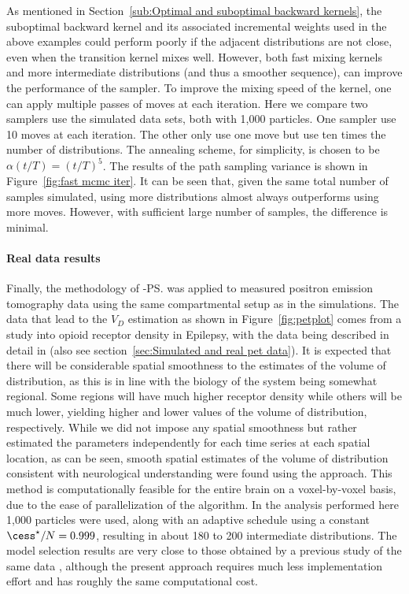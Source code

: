 As mentioned in Section~\ref{sub:Optimal and suboptimal backward kernels}, the
suboptimal backward kernel and its associated incremental weights used in the
above examples could perform poorly if the adjacent distributions are not
close, even when the transition kernel mixes well. However, both fast mixing
kernels and more intermediate distributions (and thus a smoother sequence),
can improve the performance of the sampler. To improve the mixing speed of the
kernel, one can apply multiple passes of \mcmc moves at each iteration. Here
we compare two samplers use the simulated data sets, both with 1,000 particles.
One sampler use 10 \mcmc moves at each iteration. The other only use one \mcmc
move but use ten times the number of distributions. The annealing scheme, for
simplicity, is chosen to be $\alpha(t/T) = (t/T)^5$. The results of the path
sampling variance is shown in Figure~\ref{fig:fast mcmc iter}. It can be seen
that, given the same total number of samples simulated, using more
distributions almost always outperforms using more \mcmc moves. However, with
sufficient large number of samples, the difference is minimal.



\paragraph{Real data results}

Finally, the methodology of \smc[2]-\ps was applied to measured positron
emission tomography data using the same compartmental setup as in the
simulations. The data that lead to the $V_D$ estimation as shown in
Figure~\ref{fig:petplot} comes from a study into opioid receptor density in
Epilepsy, with the data being described in detail in \cite{Jiang:2009kf} (also
see section~\ref{sec:Simulated and real pet data}). It is expected that there
will be considerable spatial smoothness to the estimates of the volume of
distribution, as this is in line with the biology of the system being somewhat
regional. Some regions will have much higher receptor density while others
will be much lower, yielding higher and lower values of the volume of
distribution, respectively.  While we did not impose any spatial smoothness
but rather estimated the parameters independently for each time series at each
spatial location, as can be seen, smooth spatial estimates of the volume of
distribution consistent with neurological understanding were found using the
approach. This method is computationally feasible for the entire brain on a
voxel-by-voxel basis, due to the ease of parallelization of the \smc
algorithm. In the analysis performed here 1,000 particles were used, along
with an adaptive schedule using a constant $\cess^\star/N = 0.999$, resulting
in about 180 to 200 intermediate distributions. The model selection results
are very close to those obtained by a  previous study of the same data
\cite{Zhou2013}, although the present approach requires much less
implementation effort and has roughly the same computational cost.

